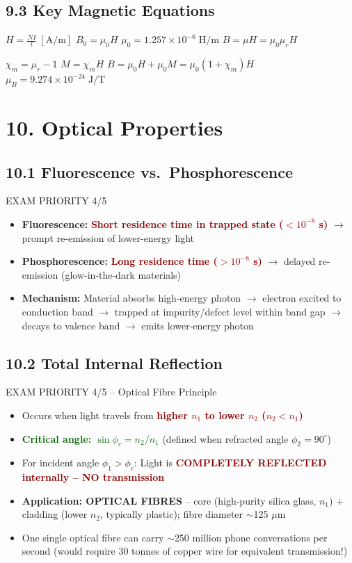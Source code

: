 \documentclass[11pt,a4paper]{article}
\newcommand{\mysec}[1]{\section*{#1}}
\newcommand{\mysubsec}[1]{\subsection*{#1}}
\newcommand{\CRIT}[1]{\textcolor{DarkRed}{\textbf{#1}}}
\newcommand{\KEY}[1]{\textcolor{SecondaryDark}{\textbf{#1}}}
\newcommand{\FML}[1]{\textcolor{DarkGreen}{\textbf{#1}}}
\newcommand{\HI}[1]{\colorbox{yellow!20}{\textcolor{DarkPurple}{\textbf{#1}}}}
\begin{document}
\mysubsec{9.3 Key Magnetic Equations}
\begin{formbox}{}
\Large\centering
$H = \frac{NI}{l}\;[\mathrm{A/m}]$ \hspace{0.4cm} $B_0 = \mu_0 H$ \hspace{0.4cm} $\mu_0 = 1.257\times10^{-6}\;\mathrm{H/m}$ \hspace{0.4cm}
$B = \mu H = \mu_0\mu_r H$

\vspace{3pt}
$\chi_m = \mu_r - 1$ \hspace{0.5cm} $M = \chi_m H$ \hspace{0.5cm} $B = \mu_0 H + \mu_0 M = \mu_0(1+\chi_m)H$ \hspace{0.5cm} $\mu_B = 9.274\times10^{-24}\;\mathrm{J/T}$
\end{formbox}

\newpage
\mysec{10. Optical Properties}

\mysubsec{10.1 Fluorescence vs.\ Phosphorescence}
\begin{impbox}{EXAM PRIORITY 4/5}
\begin{itemize}[leftmargin=*,nosep]
    \item \KEY{Fluorescence:} \CRIT{Short residence time in trapped state ($<10^{-8}$ s)} $\to$ prompt re-emission of lower-energy light
    \item \KEY{Phosphorescence:} \CRIT{Long residence time ($>10^{-8}$ s)} $\to$ delayed re-emission (glow-in-the-dark materials)
    \item \textbf{Mechanism:} Material absorbs high-energy photon $\to$ electron excited to conduction band $\to$ trapped at impurity/defect level within band gap $\to$ decays to valence band $\to$ emits lower-energy photon
\end{itemize}
\end{impbox}

\mysubsec{10.2 Total Internal Reflection}
\begin{critbox}{EXAM PRIORITY 4/5 -- Optical Fibre Principle}
\begin{itemize}[leftmargin=*,nosep]
    \item Occurs when light travels from \CRIT{higher $n_1$ to lower $n_2$ ($n_2 < n_1$)}
    \item \FML{Critical angle: $\sin\phi_c = n_2/n_1$} (defined when refracted angle $\phi_2 = 90^\circ$)
    \item For incident angle $\phi_1 > \phi_c$: Light is \CRIT{COMPLETELY REFLECTED internally -- NO transmission}
    \item \HI{\textbf{Application: OPTICAL FIBRES}} -- core (high-purity silica glass, $n_1$) + cladding (lower $n_2$, typically plastic); fibre diameter $\sim$125 $\mu$m
    \item One single optical fibre can carry $\sim$250 million phone conversations per second (would require 30 tonnes of copper wire for equivalent transmission!)
\end{itemize}
\end{critbox}
\end{document}

